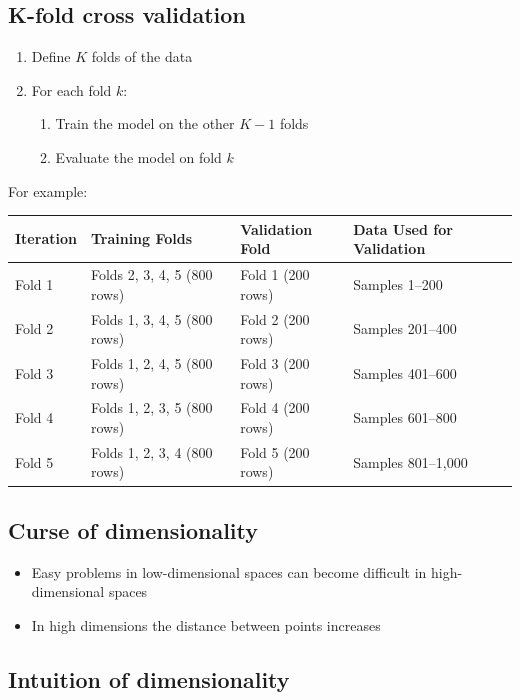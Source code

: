 \documentclass[12pt,a4paper]{article}
\begin{document}
\subsection{K-fold cross validation}
\begin{enumerate}
    \item Define $K$ folds of the data
    \item For each fold $k$:
    \begin{enumerate}
        \item Train the model on the other $K-1$ folds
        \item Evaluate the model on fold $k$
    \end{enumerate}
\end{enumerate}
For example:
\begin{table}[H]
\centering
\begin{tabular}{|l|l|l|l|}
\hline
\textbf{Iteration} & \textbf{Training Folds} & \textbf{Validation Fold} & \textbf{Data Used for Validation} \\ \hline
Fold 1 & Folds 2, 3, 4, 5 (800 rows) & Fold 1 (200 rows) & Samples 1--200 \\ \hline
Fold 2 & Folds 1, 3, 4, 5 (800 rows) & Fold 2 (200 rows) & Samples 201--400 \\ \hline
Fold 3 & Folds 1, 2, 4, 5 (800 rows) & Fold 3 (200 rows) & Samples 401--600 \\ \hline
Fold 4 & Folds 1, 2, 3, 5 (800 rows) & Fold 4 (200 rows) & Samples 601--800 \\ \hline
Fold 5 & Folds 1, 2, 3, 4 (800 rows) & Fold 5 (200 rows) & Samples 801--1,000 \\ \hline
\end{tabular}
\end{table}

\subsection{Curse of dimensionality}
\begin{itemize}
    \item Easy problems in low-dimensional spaces can become difficult in high-dimensional spaces
    \item In high dimensions the distance between points increases
\end{itemize}

\subsection{Intuition of dimensionality}
\end{document}
